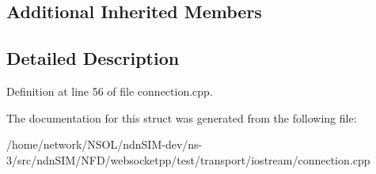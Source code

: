 \subsection*{Additional Inherited Members}


\subsection{Detailed Description}


Definition at line 56 of file connection.\+cpp.



The documentation for this struct was generated from the following file\+:\begin{DoxyCompactItemize}
\item 
/home/network/\+N\+S\+O\+L/ndn\+S\+I\+M-\/dev/ns-\/3/src/ndn\+S\+I\+M/\+N\+F\+D/websocketpp/test/transport/iostream/connection.\+cpp\end{DoxyCompactItemize}
